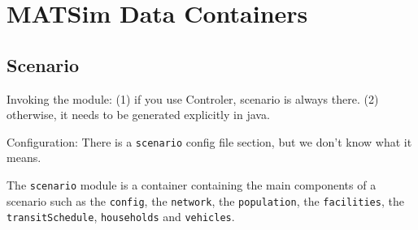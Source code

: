 \section{MATSim Data Containers}
\label{sec:extending-data-containers}
\subsection{Scenario}
\label{sec:extending-scenario}

\begin{compactitem}
\item Invoking the module: (1) if you use Controler, scenario is always there. (2) otherwise, it needs to be generated explicitly in java.  

\item Configuration: There is a \lstinline|scenario| config file section, but we don't know what it means.  
\end{compactitem}

The \lstinline|scenario| module is
a container containing the main components of a scenario such as the \lstinline|config|, the \lstinline|network|, the \lstinline|population|, the \lstinline|facilities|, the \lstinline|transitSchedule|, \lstinline|households| and \lstinline|vehicles|.


